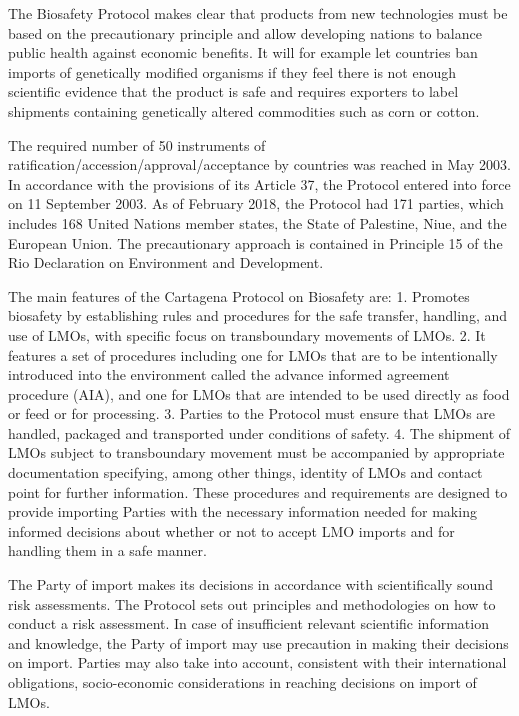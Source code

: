 \documentclass[]{book}
\begin{document}
The Biosafety Protocol makes clear that products from new technologies must be based on the precautionary principle and allow developing nations to balance public health against economic benefits. It will for example let countries ban imports of genetically modified organisms if they feel there is not enough scientific evidence that the product is safe and requires exporters to label shipments containing genetically altered commodities such as corn or cotton.

The required number of 50 instruments of ratification/accession/approval/acceptance by countries was reached in May 2003. In accordance with the provisions of its Article 37, the Protocol entered into force on 11 September 2003. As of February 2018, the Protocol had 171 parties, which includes 168 United Nations member states, the State of Palestine, Niue, and the European Union.
The precautionary approach is contained in Principle 15 of the Rio Declaration on Environment and Development.

The main features of the Cartagena Protocol on Biosafety are:
1. Promotes biosafety by establishing rules and procedures for the safe transfer, handling, and use of LMOs, with specific focus on transboundary movements of LMOs.
2. It features a set of procedures including one for LMOs that are to be intentionally introduced into the environment called the advance informed agreement procedure (AIA), and one for LMOs that are intended to be used directly as food or feed or for processing.
3. Parties to the Protocol must ensure that LMOs are handled, packaged and transported under conditions of safety.
4. The shipment of LMOs subject to transboundary movement must be accompanied by appropriate documentation specifying, among other things, identity of LMOs and contact point for further information.
These procedures and requirements are designed to provide importing Parties with the necessary information needed for making informed decisions about whether or not to accept LMO imports and for handling them in a safe manner.

The Party of import makes its decisions in accordance with scientifically sound risk assessments. The Protocol sets out principles and methodologies on how to conduct a risk assessment. In case of insufficient relevant scientific information and knowledge, the Party of import may use precaution in making their decisions on import. Parties may also take into account, consistent with their international obligations, socio-economic considerations in reaching decisions on import of LMOs.
\end{document}

